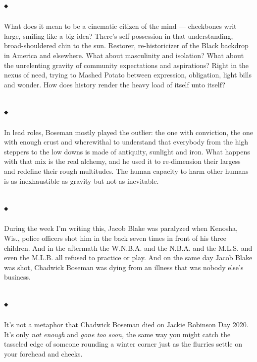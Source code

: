 \subsection{⬩}

What does it mean to be a cinematic citizen of the mind --- cheekbones
writ large, smiling like a big idea? There's self-possession in that
understanding, broad-shouldered chin to the sun. Restorer,
re-historicizer of the Black backdrop in America and elsewhere. What
about masculinity and isolation? What about the unrelenting gravity of
community expectations and aspirations? Right in the nexus of need,
trying to Mashed Potato between expression, obligation, light bills and
wonder. How does history render the heavy load of itself unto itself?

\hypertarget{-1}{%
\subsection{⬩}\label{-1}}

In lead roles, Boseman mostly played the outlier: the one with
conviction, the one with enough crust and wherewithal to understand that
everybody from the high steppers to the low downs is made of antiquity,
sunlight and iron. What happens with that mix is the real alchemy, and
he used it to re-dimension their largess and redefine their rough
multitudes. The human capacity to harm other humans is as inexhaustible
as gravity but not as inevitable.

\hypertarget{-2}{%
\subsection{⬩}\label{-2}}

During the week I'm writing this, Jacob Blake was paralyzed when
Kenosha, Wis., police officers shot him in the back seven times in front
of his three children. And in the aftermath the W.N.B.A. and the N.B.A.
and the M.L.S. and even the M.L.B. all refused to practice or play. And
on the same day Jacob Blake was shot, Chadwick Boseman was dying from an
illness that was nobody else's business.

\hypertarget{-3}{%
\subsection{⬩}\label{-3}}

It's not a metaphor that Chadwick Boseman died on Jackie Robinson Day
2020. It's only \emph{not enough} and \emph{gone too soon,} the same way
you might catch the tasseled edge of someone rounding a winter corner
just as the flurries settle on your forehead and cheeks.

